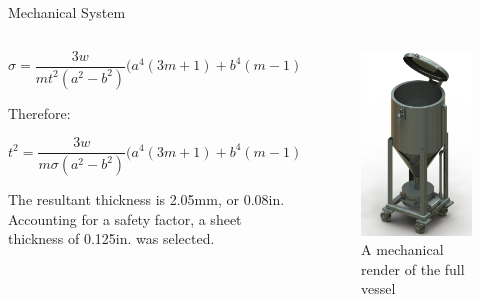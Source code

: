 \documentclass[final]{beamer}
\newlength{\onecolwid}
\newlength{\twocolwid}
\begin{document}
\begin{frame}[t]
\begin{columns}[t]
\begin{column}{\twocolwid}
\begin{block}{Mechanical System}
\begin{columns}[t,totalwidth=\twocolwid]
\begin{column}{\onecolwid}
\begin{justify}
\scriptsize
\begin{equation}
\sigma = \frac{3w}{mt^{2}(a^{2} - b^{2})}\Big(a^{4}(3m + 1) + b^{4}(m - 1) - 4ma^{2}b^{2} - 4(m + 1)a^{2}b^{2}\ln(\frac{a}{b}) \Big)
\label{eq:stress}
\end{equation}
\normalsize

\noindent Therefore:

\scriptsize
\begin{equation}
t^{2} = \frac{3w}{m\sigma(a^{2} - b^{2})}\Big(a^{4}(3m + 1) + b^{4}(m - 1) - 4ma^{2}b^{2} - 4(m + 1)a^{2}b^{2}\ln(\frac{a}{b}) \Big)
\end{equation}
\normalsize

The resultant thickness is 2.05mm, or 0.08in. Accounting for a safety factor, a sheet thickness of 0.125in. was selected.
\end{justify}

\end{column} %

\begin{column}{\onecolwid} %

\vspace{-.3in}
\begin{figure}
\includegraphics[width=0.56\linewidth]{full-vessel-render.png}
\caption{A mechanical render of the full vessel}
\end{figure}


\end{column}
\end{columns}
\end{block}
\end{column}
\end{columns}
\end{frame}
\end{document}
